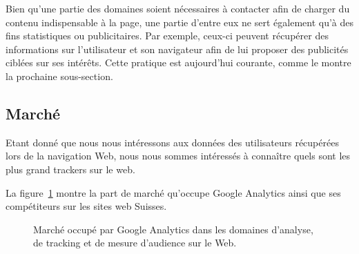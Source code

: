 		Bien qu'une partie des domaines soient nécessaires à contacter afin de charger du contenu indispensable à la page, une partie d'entre eux ne sert également qu'à des fins statistiques ou publicitaires. Par exemple, ceux-ci peuvent récupérer des informations sur l'utilisateur et son navigateur afin de lui proposer des publicités ciblées sur ses intérêts. Cette pratique est aujourd'hui courante, comme le montre la prochaine sous-section.

	\subsection{Marché}

		Etant donné que nous nous intéressons aux données des utilisateurs récupérées lors de la navigation Web, nous nous sommes intéressés à connaître quels sont les plus grand trackers sur le web.

		La figure~\ref{analytics-usage} montre la part de marché qu'occupe Google Analytics ainsi que ses compétiteurs sur les sites web Suisses.

		\begin{figure}[!h]
			\centering
			\caption{Marché occupé par Google Analytics dans les domaines d'analyse, de tracking et de mesure d'audience sur le Web.}
			\label{analytics-usage}
		\end{figure}

